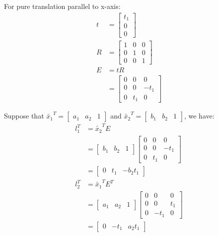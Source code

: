 \documentclass[11pt]{article} \usepackage{fullpage} \usepackage{graphicx} \usepackage{epstopdf} \usepackage{color} \usepackage{psfrag} \usepackage{pdfsync}\usepackage{indentfirst}\usepackage{subfigure}\usepackage{float}\usepackage[section]{placeins}
\begin{document}
For pure translation parallel to x-axis:
\begin{align}
	t & = \begin{bmatrix} t_1 \\ 0 \\ 0 \end{bmatrix} \\
	R & = \begin{bmatrix} 1 & 0 & 0 \\ 0 & 1 & 0 \\ 0 & 0 & 1 \end{bmatrix} \\
	E & = tR \\
	& = \begin{bmatrix}
	0 & 0 &0 \\
	0 & 0 & -t_1 \\
	0 & t_1 & 0
	\end{bmatrix}
\end{align}

Suppose that $\tilde{x_1}^T = \begin{bmatrix} a_1 & a_2 & 1\end{bmatrix}$ and $\tilde{x_2}^T = \begin{bmatrix} b_1 & b_2 & 1\end{bmatrix}$, we have:
\begin{align}
	l_{1}^T & = \tilde{x_2}^TE \\
	& = \begin{bmatrix} b_1 & b_2 & 1\end{bmatrix}\begin{bmatrix}
	0 & 0 &0 \\
	0 & 0 & -t_1 \\
	0 & t_1 & 0
	\end{bmatrix} \\
	& = \begin{bmatrix} 0 & t_1 & -b_2t_1 \end{bmatrix} \\
	l_{2}^T & = \tilde{x_1}^TE^T \\
	& = \begin{bmatrix} a_1 & a_2 & 1\end{bmatrix}\begin{bmatrix}
	0 & 0 &0 \\
	0 & 0 & t_1 \\
	0 & -t_1 & 0
	\end{bmatrix} \\
	& = \begin{bmatrix} 0 & -t_1 & a_2t_1 \end{bmatrix}
\end{align}
\end{document}
